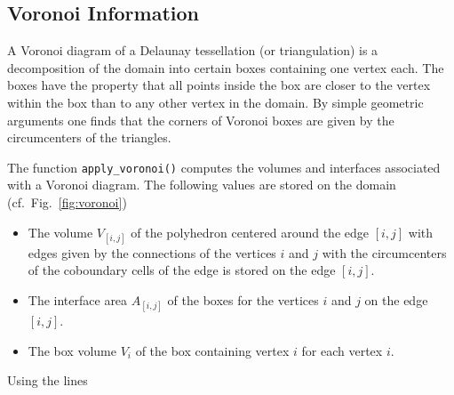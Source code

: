  \subsection{Voronoi Information}
 A Voronoi diagram of a Delaunay tessellation (or triangulation) is a decomposition of the domain into certain boxes containing one vertex each.
 The boxes have the property that all points inside the box are closer to the vertex within the box than to any other vertex in the domain. 
 By simple geometric arguments one finds that the corners of Voronoi boxes are given by the circumcenters of the triangles.

 The function \lstinline|apply_voronoi()| computes the volumes and interfaces associated with a Voronoi diagram. The following values are stored on the domain (cf.~Fig.~\ref{fig:voronoi})
 \begin{itemize}
  \item The volume $V_{[i,j]}$ of the polyhedron centered around the edge $[i,j]$ with edges given by the connections of the vertices $i$ and $j$ with the circumcenters of the coboundary cells of the edge is stored on the edge $[i,j]$.
  \item The interface area $A_{[i,j]}$ of the boxes for the vertices $i$ and $j$ on the edge $[i,j]$.
  \item The box volume $V_i$ of the box containing vertex $i$ for each vertex $i$.
 \end{itemize}
 Using the lines
